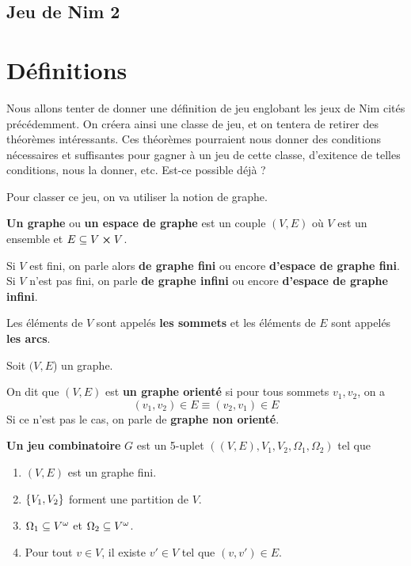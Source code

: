 \documentclass[a4paper, 11pt]{report}
\begin{document}
\subsection*{Jeu de Nim 2}

\section{Définitions}

Nous allons tenter de donner une définition de jeu englobant les jeux de Nim
cités précédemment. On créera ainsi une classe de jeu, et on tentera de retirer
des théorèmes intéressants. Ces théorèmes pourraient nous donner des conditions
nécessaires et suffisantes pour gagner à un jeu de cette classe, d'exitence de
telles conditions, nous la donner, etc. Est-ce possible déjà ?

Pour classer ce jeu, on va utiliser la notion de graphe.

\begin{definition} [Graphe]
	\textbf{Un graphe} ou \textbf{un espace de graphe} est un couple $(V, E)$ où
	$V$ est un ensemble et $E \subseteq V \cross V$.

	Si $V$ est fini, on parle alors \textbf{de graphe fini} ou encore
	\textbf{d'espace de graphe fini}. Si $V$ n'est pas fini, on parle
	\textbf{de graphe infini} ou encore \textbf{d'espace de graphe infini}.

	Les éléments de $V$ sont appelés \textbf{les sommets} et les éléments de $E$
	sont appelés \textbf{les arcs}.
\end{definition}

\begin{definition} 
	Soit $(V, E$) un graphe.

	On dit que $(V, E)$ est \textbf{un graphe orienté} si pour tous sommets
	$v_{1}, v_{2}$, on a
	\begin{equation}
		(v_{1}, v_{2}) \in E \equiv (v_{2}, v_{1}) \in E
	\end{equation}
	Si ce n'est pas le cas, on parle de \textbf{graphe non orienté}.
\end{definition}

\begin{definition} 
	\textbf{Un jeu combinatoire} $G$ est un 5-uplet $( (V, E), V_{1}, V_{2},
	\Omega_{1}, \Omega_{2})$ tel que

	\begin{enumerate}
		\item $(V, E)$ est un graphe fini.
		\item $\left\{ V_{1}, V_{2} \right\}$ forment une partition de $V$.
		\item $\Omega_{1} \subseteq V^{\omega}$ et $\Omega_{2} \subseteq
			V^{\omega}$.
		\item Pour tout $v \in V$, il existe $v' \in V$ tel que $(v, v') \in E$.
	\end{enumerate}
\end{definition}
\end{document}
